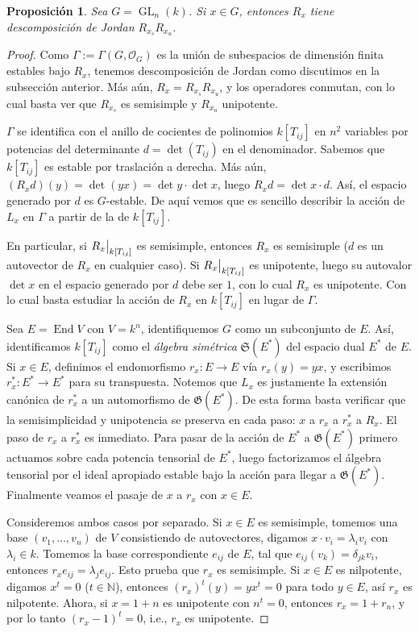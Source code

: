 \documentclass[spanish,12pt]{amsart}
\newtheorem{proposition}[theorem]{Proposición}
\theoremstyle{definition}
\theoremstyle{remark}
\numberwithin{equation}{section}
\newcommand{\naturals}{\mathbb{N}}
\newcommand\rest[2]{{%
  \left.\kern-\nulldelimiterspace %
  #1 %
  \vphantom{\big|} %
  \right|_{#2} %
  }}
\renewcommand{\O}{\mathcal{O}}
\begin{document}
\begin{proposition}
Sea $G = \operatorname{GL}_n (k)$. Si $x \in G$, entonces $R_x$ tiene descomposición de Jordan $R_{x_s} R_{x_u}$.
\end{proposition}

\begin{proof}
Como $\Gamma := \Gamma (G, \O_G)$ es la unión de subespacios de dimensión finita estables bajo $R_x$, tenemos descomposición de Jordan como discutimos en la subsección anterior. Más aún, $R_x = R_{x_s} R_{x_u}$, y los operadores conmutan, con lo cual basta ver que $R_{x_s}$ es semisimple y $R_{x_u}$ unipotente.

$\Gamma$ se identifica con el anillo de cocientes de polinomios $k[T_{ij}]$ en $n^2$ variables por potencias del determinante $d = \det (T_{ij})$ en el denominador. Sabemos que $k[T_{ij}]$ es estable por traslación a derecha. Más aún, $(R_x d) (y) = \det (y x) = \det y \cdot \det x$, luego $R_x d = \det x \cdot d$. Así, el espacio generado por $d$ es $G$-estable. De aquí vemos que es sencillo describir la acción de $L_x$ en $\Gamma$ a partir de la de $k[T_{ij}]$.

En particular, si $\rest{R_x}{k[T_{ij}]}$ es semisimple, entonces $R_x$ es semisimple ($d$ es un autovector de $R_x$ en cualquier caso). Si $\rest{R_x}{k[T_{ij}]}$ es unipotente, luego su autovalor $\det x$ en el espacio generado por $d$ debe ser $1$, con lo cual $R_x$ es unipotente. Con lo cual basta estudiar la acción de $R_x$ en $k[T_{ij}]$ en lugar de $\Gamma$.

Sea $E = \operatorname{End} V$ con $V = k^n$, identifiquemos $G$ como un subconjunto de $E$. Así, identificamos $k[T_{ij}]$ como el \textit{álgebra simétrica} $\mathfrak S (E^*)$ del espacio dual $E^*$ de $E$. Si $x \in E$, definimos el endomorfismo $r_x : E \to E$ vía $r_{x} (y) = y x$, y escribimos $r_x^* : E^* \to E^*$ para su transpuesta. Notemos que $L_x$ es justamente la extensión canónica de $r_x^*$ a un automorfismo de $\mathfrak G (E^*)$. De esta forma basta verificar que la semisimplicidad y unipotencia se preserva en cada paso: $x$ a $r_x$ a $r_x^*$ a $R_x$. El paso de $r_x$ a $r_x^*$ es inmediato. Para pasar de la acción de $E^*$ a $\mathfrak G (E^*)$ primero actuamos sobre cada potencia tensorial de $E^*$, luego factorizamos el álgebra tensorial por el ideal apropiado estable bajo la acción para llegar a $\mathfrak G (E^*)$. Finalmente veamos el pasaje de $x$ a $r_x$ con $x \in E$.

Consideremos ambos casos por separado. Si $ x\in E$ es semisimple, tomemos una base $(v_1, \ldots, v_n)$ de $V$ consistiendo de autovectores, digamos $x \cdot v_i = \lambda_i v_i$ con $\lambda_i \in k$. Tomemos la base correspondiente $e_{ij}$ de $E$, tal que $e_{ij} (v_k) = \delta_{jk} v_i$, entonces $r_x e_{ij} = \lambda_j e_{ij}$. Esto prueba que $r_x$ es semisimple. Si $x \in E$ es nilpotente, digamos $x^t = 0$ ($t \in \naturals$), entonces $(r_x)^t (y) = y x^t = 0$ para todo $y \in E$, así $r_x$ es nilpotente. Ahora, si $x = 1 + n$ es unipotente con $n^t = 0$, entonces $r_x = 1 + r_n$, y por lo tanto $(r_x - 1)^t = 0$, i.e., $r_x $ es unipotente.
\end{proof}
\end{document}
